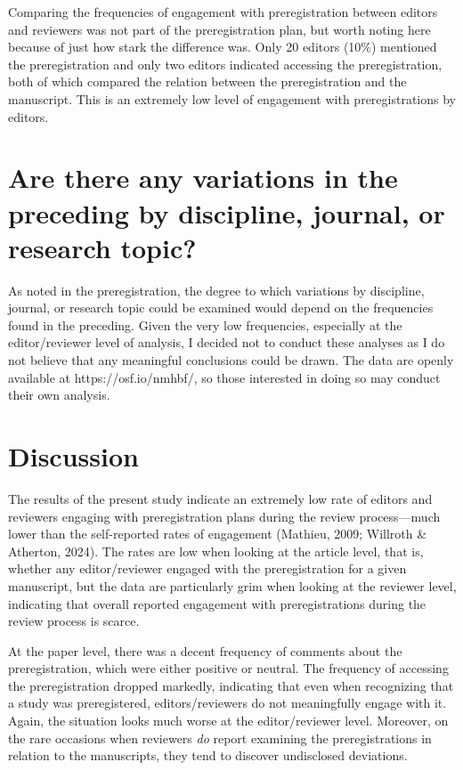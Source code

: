\documentclass[authordate, empirical]{jote-new-article}
\begin{document}
	Comparing the frequencies of engagement with preregistration between editors and reviewers was not part of the preregistration plan, but worth noting here because of just how stark the difference was. Only 20 editors (10\%) mentioned the preregistration and only two editors indicated accessing the preregistration, both of which compared the relation between the preregistration and the manuscript. This is an extremely low level of engagement with preregistrations by editors.



	\section{\textbf{Are there any variations in the preceding by discipline, journal, or research topic?}}



	As noted in the preregistration, the degree to which variations by discipline, journal, or research topic could be examined would depend on the frequencies found in the preceding. Given the very low frequencies, especially at the editor/reviewer level of analysis, I decided not to conduct these analyses as I do not believe that any meaningful conclusions could be drawn. The data are openly available at https://osf.io/nmhbf/, so those interested in doing so may conduct their own analysis.



	\section{\textbf{Discussion}}



	The results of the present study indicate an extremely low rate of editors and reviewers engaging with preregistration plans during the review process—much lower than the self-reported rates of engagement (Mathieu, 2009; Willroth \& Atherton, 2024). The rates are low when looking at the article level, that is, whether any editor/reviewer engaged with the preregistration for a given manuscript, but the data are particularly grim when looking at the reviewer level, indicating that overall reported engagement with preregistrations during the review process is scarce.



	At the paper level, there was a decent frequency of comments about the preregistration, which were either positive or neutral. The frequency of accessing the preregistration dropped markedly, indicating that even when recognizing that a study was preregistered, editors/reviewers do not meaningfully engage with it. Again, the situation looks much worse at the editor/reviewer level. Moreover, on the rare occasions when reviewers \emph{do} report examining the preregistrations in relation to the manuscripts, they tend to discover undisclosed deviations.
\end{document}
